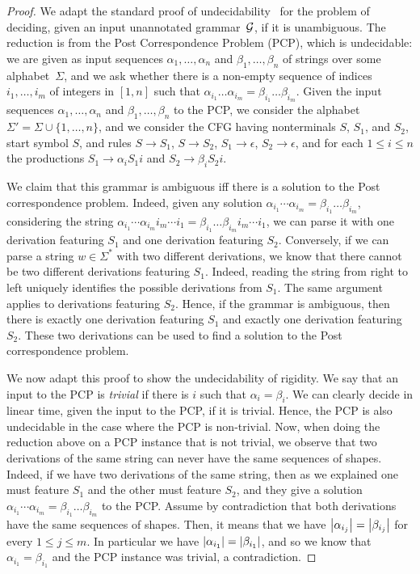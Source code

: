 \begin{proof}
  We adapt the standard proof of undecidability~\cite[Ambiguity Theorem
  2]{chomsky1959algebraic} for the problem of deciding, given an input
  unannotated grammar~$\mathcal{G}$, if it is unambiguous. The reduction is from the Post
  Correspondence Problem (PCP), which is undecidable: we are given as input sequences $\alpha_1, \ldots, \alpha_n$
  and $\beta_1, \ldots, \beta_n$ of strings over some alphabet~$\Sigma$, and we ask whether
  there is a non-empty sequence of indices $i_1, \ldots, i_m$ of integers in $[1, n]$ such that
  $\alpha_{i_1} \ldots \alpha_{i_m} = \beta_{i_1} \ldots \beta_{i_m}$. Given the
  input sequences $\alpha_1, \ldots, \alpha_n$ and $\beta_1, \ldots, \beta_n$ to
  the PCP, we
  consider the alphabet $\Sigma' = \Sigma \cup \{1, \ldots, n\}$, and we
  consider the CFG having nonterminals $S$, $S_1$, and $S_2$, start symbol $S$,
  and rules $S \rightarrow S_1$, $S \rightarrow S_2$, $S_1 \rightarrow
  \epsilon$, $S_2\rightarrow \epsilon$, and for each $1 \leq
  i \leq n$ the productions $S_1 \rightarrow \alpha_i S_1 i$ and $S_2
  \rightarrow \beta_i S_2 i$.

  We claim that this grammar is ambiguous iff there is a solution to the Post
  correspondence problem. Indeed, given any solution $\alpha_{i_1} \cdots
  \alpha_{i_m} = \beta_{i_1} \ldots \beta_{i_m}$, considering the string 
$\alpha_{i_1} \cdots
  \alpha_{i_m} i_m \cdots i_1 = \beta_{i_1} \ldots \beta_{i_m} i_m \cdots i_1$,
  we can parse it with one derivation  featuring $S_1$ and one derivation
  featuring $S_2$. Conversely, if we can parse a string $w \in \Sigma^*$ with two
  different derivations, we know that there cannot be two different derivations
  featuring $S_1$. Indeed, reading the string from right to left uniquely
  identifies the possible derivations from $S_1$. The same argument applies to
  derivations featuring $S_2$. Hence, if the grammar is ambiguous, then there is
  exactly one derivation featuring $S_1$ and exactly one derivation featuring
  $S_2$. These two derivations can be used to find a solution to the Post
  correspondence problem.

  We now adapt this proof to show the undecidability of rigidity. We
  say that an input to the PCP is \emph{trivial} if there is $i$ such that
  $\alpha_i = \beta_i$. We can clearly decide in linear time, given the input to
  the PCP, if it is trivial. Hence, the PCP is also undecidable in the case
  where the PCP is non-trivial. Now, when doing the reduction above on a PCP
  instance that is not trivial, we observe that two derivations of the same string
  can never have the same sequences of shapes. Indeed, if we have two derivations of the same
  string, then as we explained one must feature $S_1$ and the other must feature
  $S_2$, and they give a solution $\alpha_{i_1} \cdots \alpha_{i_m} =
  \beta_{i_1} \ldots \beta_{i_m}$ to the PCP. Assume by contradiction that both
  derivations have the same sequences of shapes. Then, 
  it means that we have $\left|\alpha_{i_j}\right| = \left|\beta_{i_j}\right|$ for every $1
  \leq j \leq m$. In particular we have $\left|\alpha_{i_1}\right| =
  \left|\beta_{i_1}\right|$, and so we know that $\alpha_{i_1} =
  \beta_{i_1}$ and the PCP instance was trivial, a contradiction.


\end{proof}
